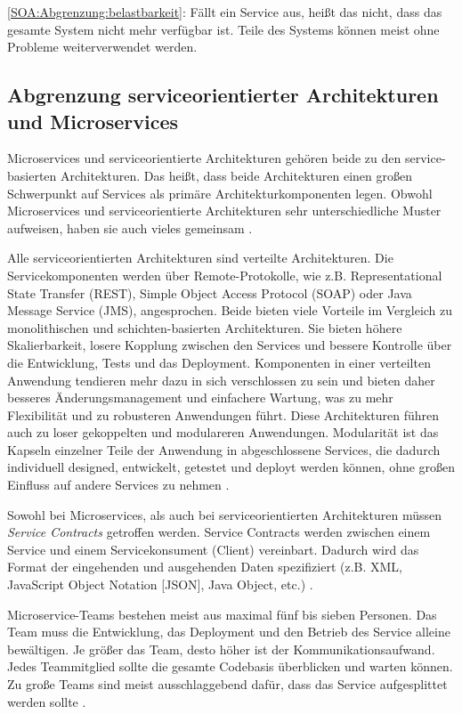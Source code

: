\ref{SOA:Abgrenzung:belastbarkeit}: Fällt ein Service aus, heißt das nicht, dass das gesamte System nicht mehr verfügbar ist. Teile des Systems können meist ohne Probleme weiterverwendet werden.



\subsection{Abgrenzung serviceorientierter Architekturen und Microservices}
Microservices und serviceorientierte Architekturen gehören beide zu den service-basierten Architekturen. Das heißt, dass beide Architekturen einen großen Schwerpunkt auf Services als primäre Architekturkomponenten legen. Obwohl Microservices und serviceorientierte Architekturen sehr unterschiedliche Muster aufweisen, haben sie auch vieles gemeinsam \cite[Kapitel 1]{MicroservicesVSSOA}.

Alle serviceorientierten Architekturen sind verteilte Architekturen. Die Servicekomponenten werden über Remote-Protokolle, wie z.B. Representational State Transfer (REST), Simple Object Access Protocol (SOAP) oder Java Message Service (JMS), angesprochen.
Beide bieten viele Vorteile im Vergleich zu monolithischen und schichten-basierten Architekturen. Sie bieten höhere Skalierbarkeit, losere Kopplung zwischen den Services und bessere Kontrolle über die Entwicklung, Tests und das Deployment. Komponenten in einer verteilten Anwendung tendieren mehr dazu in sich verschlossen zu sein und bieten daher besseres Änderungsmanagement und einfachere Wartung, was zu mehr Flexibilität und zu robusteren Anwendungen führt.
Diese Architekturen führen auch zu loser gekoppelten und modulareren Anwendungen. 
Modularität ist das Kapseln einzelner Teile der Anwendung in abgeschlossene Services, die dadurch individuell designed, entwickelt, getestet und deployt werden können, ohne großen Einfluss auf andere Services zu nehmen \cite[Kapitel 1]{MicroservicesVSSOA}.

Sowohl bei Microservices, als auch bei serviceorientierten Architekturen müssen \textit{Service Contracts} getroffen werden. Service Contracts werden zwischen einem Service und einem Servicekonsument (Client) vereinbart. Dadurch wird das Format der eingehenden und ausgehenden Daten spezifiziert (z.B. XML, JavaScript Object Notation [JSON], Java Object, etc.) \cite[Kapitel 1]{MicroservicesVSSOA}. 

Microservice-Teams bestehen meist aus maximal fünf bis sieben Personen. Das Team muss die Entwicklung, das Deployment und den Betrieb des Service alleine bewältigen. Je größer das Team, desto höher ist der Kommunikationsaufwand. Jedes Teammitglied sollte die gesamte Codebasis überblicken und warten können. Zu große Teams sind meist ausschlaggebend dafür, dass das Service aufgesplittet werden sollte \cite[Kapitel 2]{MicroservicesVSSOA}.

